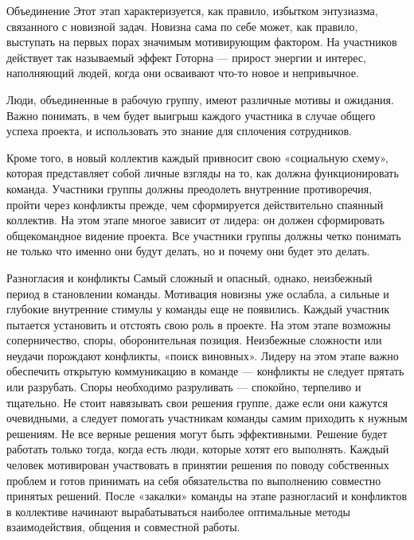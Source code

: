 \documentclass{../industrial-development}
\begin{document}
\lecturenotes

Объединение
Этот этап характеризуется, как правило, избытком энтузиазма, связанного с новизной задач. Новизна сама по себе может, как правило, выступать на первых порах значимым мотивирующим фактором. На участников действует так называемый эффект Готорна — прирост энергии и интерес, наполняющий людей, когда они осваивают что-то новое и непривычное.

Люди, объединенные в рабочую группу, имеют различные мотивы и ожидания. Важно понимать, в чем будет выигрыш каждого участника в случае общего успеха проекта, и использовать это знание для сплочения сотрудников. 

Кроме того, в новый коллектив каждый привносит свою «социальную схему», которая представляет собой личные взгляды на то, как должна функционировать команда. Участники группы должны преодолеть внутренние противоречия, пройти через конфликты прежде, чем сформируется действительно спаянный коллектив. На этом этапе многое зависит от лидера: он должен сформировать общекомандное видение проекта. Все участники группы должны четко понимать не только что именно они будут делать, но и почему они будет это делать.

Разногласия и конфликты
Самый сложный и опасный, однако, неизбежный период в становлении команды. Мотивация новизны уже ослабла, а сильные и глубокие внутренние стимулы у команды еще не появились. Каждый участник пытается установить и отстоять свою роль в проекте. На этом этапе возможны соперничество, споры, оборонительная позиция. Неизбежные сложности или неудачи порождают конфликты, «поиск виновных».
Лидеру на этом этапе важно обеспечить открытую коммуникацию в команде — конфликты не следует прятать или разрубать. Споры необходимо разруливать — спокойно, терпеливо и тщательно. Не стоит навязывать свои решения группе, даже если они кажутся очевидными, а следует помогать участникам команды самим приходить к нужным решениям. Не все верные решения могут быть эффективными. Решение будет работать только тогда, когда есть люди, которые хотят его выполнять. Каждый человек мотивирован участвовать в принятии решения по поводу собственных проблем и готов принимать на себя обязательства по выполнению совместно принятых решений.
После «закалки» команды на этапе разногласий и конфликтов в коллективе начинают вырабатываться наиболее оптимальные методы взаимодействия, общения и совместной работы.
\end{document}
